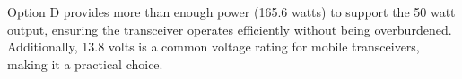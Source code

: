 Option D provides more than enough power (165.6 watts) to support the 50 watt output, ensuring the transceiver operates efficiently without being overburdened. Additionally, 13.8 volts is a common voltage rating for mobile transceivers, making it a practical choice.

